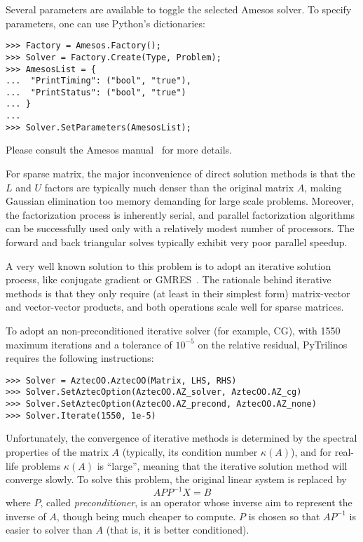\documentclass[10pt,relax]{SANDreport}
\begin{document}
Several parameters are available to toggle the selected Amesos solver.
To specify parameters, one can use Python's dictionaries:
\begin{verbatim}
>>> Factory = Amesos.Factory();
>>> Solver = Factory.Create(Type, Problem);
>>> AmesosList = {
...  "PrintTiming": ("bool", "true"),
...  "PrintStatus": ("bool", "true")
... }
...
>>> Solver.SetParameters(AmesosList);
\end{verbatim}
Please consult the Amesos manual~\cite{Amesos-Reference-Guide} for more
details.

\bigskip

For sparse matrix, the major inconvenience of direct solution methods is that
the $L$ and $U$ factors are typically much denser than the original matrix
$A$, making Gaussian elimination too memory demanding for large scale
problems. Moreover, the factorization process is inherently serial, and
parallel factorization algorithms can be successfully used only with a
relatively modest number of processors. The
forward and back triangular solves typically exhibit very poor parallel speedup.

A very well known solution to this problem is to adopt an iterative solution
process, like conjugate gradient or GMRES~\cite{FIXME}. The rationale behind
iterative methods is that they only require (at least in their simplest form)
matrix-vector and vector-vector products, and both operations scale well for
sparse matrices. 

To adopt an non-preconditioned iterative solver (for example, CG), with 1550
maximum iterations and a tolerance of $10^{-5}$ on the relative residual,
  PyTrilinos requires the following instructions:
\begin{verbatim}
>>> Solver = AztecOO.AztecOO(Matrix, LHS, RHS)
>>> Solver.SetAztecOption(AztecOO.AZ_solver, AztecOO.AZ_cg)
>>> Solver.SetAztecOption(AztecOO.AZ_precond, AztecOO.AZ_none)
>>> Solver.Iterate(1550, 1e-5)
\end{verbatim}

Unfortunately, the convergence of
iterative methods is determined by the spectral properties of the matrix $A$
(typically, its condition number $\kappa(A)$), and for
real-life problems $\kappa(A)$ is ``large'', meaning that the iterative
solution method will converge slowly. To solve this problem,
the original linear system is replaced by 
\[
A P P^{-1} X = B
\]
where $P$, called {\sl preconditioner}, is an operator whose inverse aim to
represent the inverse of $A$, though being much cheaper to compute.
$P$ is chosen so that $AP^{-1}$ is easier to solver than $A$ 
(that is, it is better conditioned). 
\end{document}
